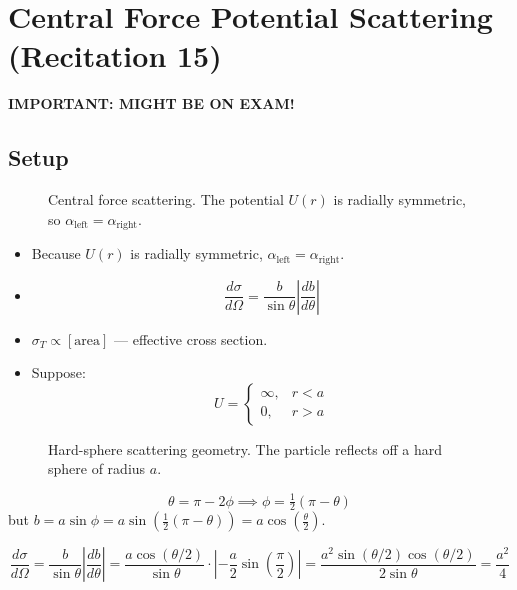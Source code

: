\section{Central Force Potential Scattering (Recitation 15)}

\textbf{IMPORTANT: MIGHT BE ON EXAM!}

\subsection{Setup}

\begin{figure}[H]
    \centering
    \caption{Central force scattering. The potential $U(r)$ is radially symmetric, so $\alpha_\text{left} = \alpha_\text{right}$.}
\end{figure}

\begin{itemize}
    \item Because $U(r)$ is radially symmetric, $\alpha_{\text{left}} = \alpha_{\text{right}}$.
    \item
    \[
        \frac{d\sigma}{d\Omega} = \frac{b}{\sin\theta}\left|\frac{db}{d\theta}\right|
    \]
    \item $\sigma_T \propto [\text{area}]$ --- effective cross section.
    \item Suppose:
    \[
        U = \begin{cases} \infty, & r < a \\ 0, & r > a \end{cases}
    \]
\end{itemize}

\begin{figure}[H]
    \centering
    \caption{Hard-sphere scattering geometry. The particle reflects off a hard sphere of radius $a$.}
\end{figure}

\[
    \theta = \pi - 2\phi \implies \phi = \tfrac{1}{2}(\pi - \theta)
\]
but $b = a\sin\phi = a\sin\!\left(\tfrac{1}{2}(\pi-\theta)\right) = a\cos\!\left(\tfrac{\theta}{2}\right)$.

\[
    \frac{d\sigma}{d\Omega}
    = \frac{b}{\sin\theta}\left|\frac{db}{d\theta}\right|
    = \frac{a\cos(\theta/2)}{\sin\theta}\cdot\left|-\frac{a}{2}\sin\!\left(\frac{\pi}{2}\right)\right|
    = \frac{a^2\sin(\theta/2)\cos(\theta/2)}{2\sin\theta}
    = \frac{a^2}{4}
\]

